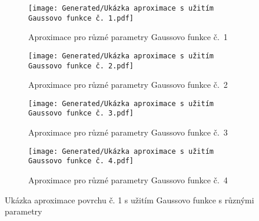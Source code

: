 \begin{landscapeimagepage}
    \begin{figure}[H]
        \centering
        \begin{subfigure}{.5\textheight}
            \centering
            \texttt{[image: Generated/Ukázka aproximace s užitím Gaussovo funkce č. 1.pdf]}
            \caption{Aproximace pro různé parametry Gaussovo funkce č.~1}
            \label{fig:Ukázka aproximace povrchu s užitím Gaussovo funkce č. 1}
        \end{subfigure}
        \vspace{0.5cm}
        \hspace{2.5cm}
        \begin{subfigure}{.5\textheight}
            \centering
            \texttt{[image: Generated/Ukázka aproximace s užitím Gaussovo funkce č. 2.pdf]}
            \caption{Aproximace pro různé parametry Gaussovo funkce č.~2}
            \label{fig:Ukázka aproximace povrchu s užitím Gaussovo funkce č. 2}
        \end{subfigure}
        \vspace{0.5cm}
        \begin{subfigure}{.5\textheight}
            \centering
            \texttt{[image: Generated/Ukázka aproximace s užitím Gaussovo funkce č. 3.pdf]}
            \caption{Aproximace pro různé parametry Gaussovo funkce č.~3}
            \label{fig:Ukázka aproximace povrchu s užitím Gaussovo funkce č. 3}
        \end{subfigure}
        \hspace{2.5cm}
        \begin{subfigure}{.5\textheight}
            \centering
            \texttt{[image: Generated/Ukázka aproximace s užitím Gaussovo funkce č. 4.pdf]}
            \caption{Aproximace pro různé parametry Gaussovo funkce č.~4}
            \label{fig:Ukázka aproximace povrchu s užitím Gaussovo funkce č. 4}
        \end{subfigure}
        \caption{Ukázka aproximace povrchu č. 1 s užitím Gaussovo funkce s různými parametry}
        \label{fig:Ukázka aproximace povrchu č. 1 s užitím Gaussovo funkce s různými parametry}
    \end{figure}
\end{landscapeimagepage}

